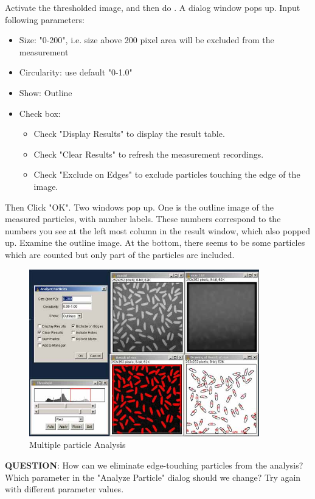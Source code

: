 \begin{indentexercise}{2}
Activate the thresholded image, and then do . A dialog window pops up. Input following
parameters:
\begin{itemize}
\item Size: "0-200", i.e. size above 200 pixel area will be excluded from the measurement
\item Circularity: use default "0-1.0"
\item Show: Outline
\item Check box:
\begin{itemize} 
\item Check "Display Results" to display the result table.
\item Check "Clear Results" to refresh the measurement recordings.
\item Check "Exclude on Edges" to exclude particles touching the edge of the image. 
\end{itemize}
\end{itemize}
Then Click "OK". Two windows pop up. One
is the outline image of the measured particles, with number labels.
These numbers correspond to the numbers you see at the left most column
in the result window, which also popped up. Examine the outline image.
At the bottom, there seems to be some particles which are counted but
only part of the particles are included. 

\begin{figure}[H]
\begin{center}
\includegraphics[width=10cm]{fig/CMCIBasicCourse201102-img120.jpg}
\caption{ Multiple particle Analysis}
\label{fig:img120}
\end{center}
\end{figure}

\textbf{QUESTION}: How can we eliminate edge-touching particles from the
analysis? Which parameter in the "Analyze
Particle" dialog should we change? Try again with
different parameter values.
\end{indentexercise}

